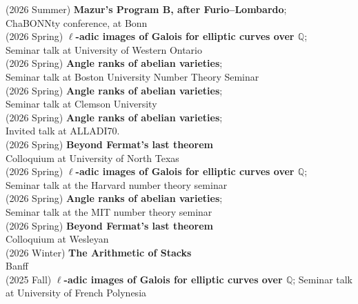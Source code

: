 \documentclass[margin,line]{res}
\begin{document}
\begin{resume}
(2026 Summer) \textbf{Mazur's Program B, after Furio--Lombardo};\\
ChaBONNty conference, at Bonn
\vspace{.05cm}\\ 
(2026 Spring) \textbf{$\ell$-adic images of Galois for elliptic curves over $\mathbb{Q}$};\\
Seminar talk at University of Western Ontario
\vspace{.05cm}\\  
(2026 Spring) \textbf{Angle ranks of abelian varieties};\\
Seminar talk at Boston University Number Theory Seminar
\vspace{.05cm}\\    
(2026 Spring) \textbf{Angle ranks of abelian varieties};\\
Seminar talk at Clemson University
\vspace{.05cm}\\  
(2026 Spring) \textbf{Angle ranks of abelian varieties};\\
Invited talk at ALLADI70.
\vspace{.05cm}\\ 
(2026 Spring) \textbf{Beyond Fermat's last theorem}\\
Colloquium at University of North Texas
\vspace{.05cm}\\    
(2026 Spring) \textbf{$\ell$-adic images of Galois for elliptic curves over $\mathbb{Q}$};\\
Seminar talk at the Harvard number theory seminar
\vspace{.05cm}\\  
(2026 Spring) \textbf{Angle ranks of abelian varieties};\\
Seminar talk at the MIT number theory seminar
\vspace{.05cm}\\
(2026 Spring) \textbf{Beyond Fermat's last theorem}\\
Colloquium at Wesleyan
\vspace{.05cm}\\
(2026 Winter) \textbf{The Arithmetic of Stacks}\\
Banff
\vspace{.05cm}\\  
(2025 Fall) \textbf{$\ell$-adic images of Galois for elliptic curves over $\mathbb{Q}$};
Seminar talk at University of French Polynesia
\vspace{.05cm}\\

\end{resume}
\end{document}
